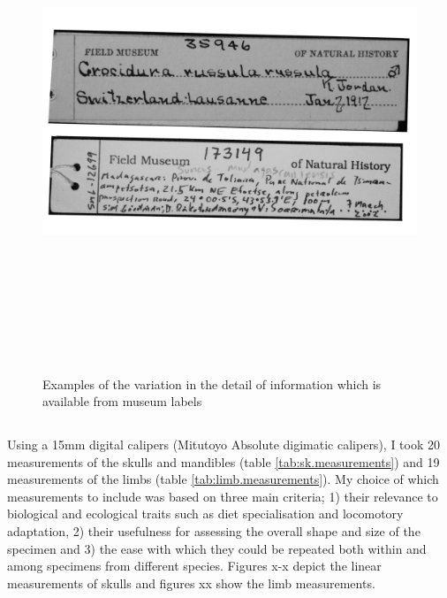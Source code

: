 
\begin{figure}[h] 
  \centering
  \includegraphics[width = 15cm, height = 15cm, keepaspectratio=true]{Methods/figures/labels.png}
    \caption[Examples of museum labels]
    {Examples of the variation in the detail of information which is available from museum labels}%
  \label{fig:museum.labels}
\end{figure}
  
\subsection{} 
\label{sect:measurements} %

	Using a 15mm digital calipers (Mitutoyo Absolute digimatic calipers), I took 20 measurements of the skulls and mandibles (table \ref{tab:sk.measurements}) and 19 measurements of the limbs (table \ref{tab:limb.measurements}). My choice of which measurements to include was based on three main criteria; 1) their relevance to biological and ecological traits such as diet specialisation and locomotory adaptation, 2) their usefulness for assessing the overall shape and size of the specimen and 3) the ease with which they could be repeated both within and among specimens from different species. 
	Figures x-x depict the linear measurements of skulls and figures xx show the limb measurements. %

